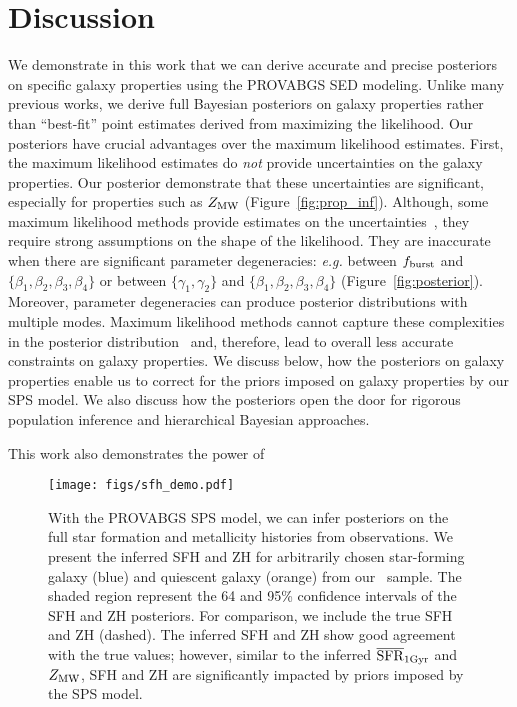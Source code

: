 \section{Discussion} \label{sec:discuss}
We demonstrate in this work that we can derive accurate and precise posteriors
on specific galaxy properties using the {\sc PROVABGS} SED modeling. 
Unlike many previous works, we derive full Bayesian posteriors on galaxy
properties rather than ``best-fit'' point estimates derived from maximizing the
likelihood. 
Our posteriors have crucial advantages over the maximum likelihood estimates. 
First, the maximum likelihood estimates do \emph{not} provide uncertainties on
the galaxy properties. 
Our posterior demonstrate that these uncertainties are significant, especially
for properties such as $Z_{\rm MW}$ (Figure~\ref{fig:prop_inf}). 
Although, some maximum likelihood methods provide estimates on the
uncertainties~\citep[\emph{e.g.}][]{moustakas2013, boquien2019}, 
they require strong assumptions on the shape of the likelihood. 
They are inaccurate when there are significant parameter degeneracies: \emph{e.g.}
between $f_{\rm burst}$ and $\{\beta_1, \beta_2, \beta_3, \beta_4\}$ or between 
$\{\gamma_1, \gamma_2\}$ and $\{\beta_1, \beta_2, \beta_3, \beta_4\}$
(Figure~\ref{fig:posterior}). 
Moreover, parameter degeneracies can produce posterior distributions with
multiple modes.
Maximum likelihood methods cannot capture these complexities in the
posterior distribution~\citep[\emph{e.g.}][]{boquien2019} and, therefore, lead
to overall less accurate constraints on galaxy properties.  
We discuss below, how the posteriors on galaxy properties enable us to
correct for the priors imposed on galaxy properties by our SPS model.
We also discuss how the posteriors open the door for rigorous population
inference and hierarchical Bayesian approaches. 


This work also demonstrates the power of  



\begin{figure}
\begin{center}
\texttt{[image: figs/sfh\_demo.pdf]}
    \caption{
        With the {\sc PROVABGS} SPS model, we can infer posteriors on the full
        star formation and metallicity histories from observations. 
        We present the inferred SFH and ZH for arbitrarily chosen star-forming
        galaxy (blue) and quiescent galaxy (orange) from our \lgal~sample.
        The shaded region represent the 64 and 95\% confidence intervals of the
        SFH and ZH posteriors. 
        For comparison, we include the true SFH and ZH (dashed). 
        The inferred SFH and ZH show good agreement with the true values;
        however, similar to the inferred $\overline{\rm SFR}_{\rm 1Gyr}$ and $Z_{\rm MW}$, SFH and ZH are
        significantly impacted by priors imposed by the SPS model. 
    } \label{fig:sfh_demo}
\end{center}
\end{figure}


